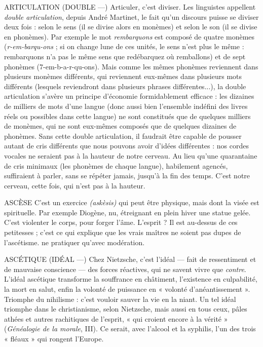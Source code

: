 ARTICULATION (DOUBLE —)  Articuler, c’est diviser. Les linguistes appellent
{\it double articulation}, depuis André Martinet,
le fait qu’un discours puisse se diviser deux fois : selon le sens (il se divise
alors en monèmes) et selon le son (il se divise en phonèmes). Par exemple le mot
{\it rembarquons} est composé de quatre monèmes ({\it r-em-barqu-ons} ; si on change
lune de ces unités, le sens n’est plus le même : rembarquons n’a pas le même sens
que redébarquez où remballons) et de sept phonèmes (7-em-b-a-r-qu-ons). Mais
comme les mêmes phonèmes reviennent dans plusieurs monèmes différents, qui
reviennent eux-mêmes dans plusieurs mots différents (lesquels reviendront dans
plusieurs phrases différentes...), la double articulation s'avère un principe d’économie
formidablement efficace : les dizaines de milliers de mots d’une langue
(donc aussi bien l’ensemble indéfini des livres réels ou possibles dans cette langue)
ne sont constitués que de quelques milliers de monèmes, qui ne sont eux-mêmes
composés que de quelques dizaines de phonèmes. Sans cette double articulation,
il faudrait être capable de pousser autant de cris différents que nous pouvons
avoir d’idées différentes : nos cordes vocales ne seraient pas à la hauteur de notre
cerveau. Au lieu qu’une quarantaine de cris minimaux (les phonèmes de chaque
langue), habilement agencés, suffiraient à parler, sans se répéter jamais, jusqu’à la
fin des temps. C’est notre cerveau, cette fois, qui n’est pas à la hauteur.

ASCÈSE C’est un exercice {\it (askèsis)} qui peut être physique, mais dont la visée
est spirituelle. Par exemple Diogène, nu, étreignant en plein hiver
une statue gelée. C’est violenter le corps, pour forger l'âme. L’esprit ? Il est au-dessus
de ces petitesses ; c’est ce qui explique que les vrais maîtres ne soient pas
dupes de l’ascétisme.
ne pratiquer qu'avec modération.

ASCÉTIQUE (IDÉAL —) Chez Nietzsche, c’est l’idéal — fait de ressentiment
et de mauvaise conscience — des forces réactives,
qui ne savent vivre que {\it contre}. L'idéal ascétique transforme la souffrance en
châtiment, l’existence en culpabilité, la mort en salut, enfin la volonté de puissance
en « volonté d’anéantissement ». Triomphe du nihilisme : c’est vouloir
sauver la vie en la niant. Un tel idéal triomphe dans le christianisme, selon
Nietzsche, mais aussi en tous ceux, pâles athées et autres rachitiques de l'esprit,
« qui croient encore à la vérité » ({\it Généalogie de la morale}, III). Ce serait, avec
l'alcool et la syphilis, l’un des trois « fléaux » qui rongent l’Europe.

